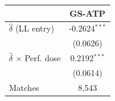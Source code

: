 \begin{tabular}{lc}
\toprule
 & GS-ATP \\
\midrule
$\hat{\delta}$ (LL entry) & -0.2624$^{***}$ \\
 & (0.0626) \\
$\hat{\delta}$ $\times$ Perf. dose & 0.2192$^{***}$ \\
 & (0.0614) \\
\midrule
Matches & 8,543 \\
\bottomrule
\end{tabular}
